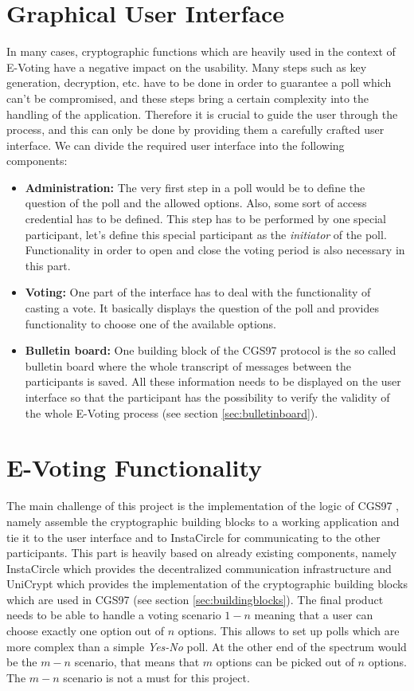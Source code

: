 \documentclass[numbers=noenddot, abstract=on, a4paper, headsepline,
footsepline, oneside, draft=off]{scrreprt}
\newcommand{\myref}[1]{(see section \vref{#1})}
\begin{document}
\section{Graphical User Interface}
\label{sec:gui}
In many cases, cryptographic functions which are heavily used in the context of
E-Voting have a negative impact on the usability. Many steps such as key
generation, decryption, etc. have to be done in order to guarantee a poll which
can't be compromised, and these steps bring a certain complexity into the
handling of the application. Therefore it is crucial to guide the user
through the process, and this can only be done by providing them a carefully
crafted user interface. We can divide the required user interface into the
following components:
\begin{itemize}
  \item \textbf{Administration:} The very first step in a poll would be to
  define the question of the poll and the allowed options. Also, some sort of
  access credential has to be defined. This step has to be performed by one
  special participant, let's define this special participant as the
  \textit{initiator} of the poll. Functionality in order to open and close the
  voting period is also necessary in this part.
  \item \textbf{Voting:} One part of the interface has to deal with the
  functionality of casting a vote. It basically displays the question of the
  poll and provides functionality to choose one of the available options.
  \item \textbf{Bulletin board:} One building block of the CGS97 protocol
  \cite{CGS97} is the so called bulletin board where the whole transcript of
  messages between the participants is saved. All these information needs to be displayed on the
  user interface so that the participant has the possibility to verify the
  validity of the whole E-Voting process \myref{sec:bulletinboard}.
\end{itemize}

\section{E-Voting Functionality}
\label{sec:evotingfunctionality}
The main challenge of this project is the implementation of the logic of CGS97 
\cite{CGS97}, namely assemble the cryptographic building blocks to a working
application and tie it to the user interface and to InstaCircle for communicating to the other
participants. This part is heavily based on already existing components, namely
InstaCircle which provides the decentralized communication infrastructure and
UniCrypt which provides the implementation of the cryptographic building blocks
which are used in CGS97 \myref{sec:buildingblocks}. The final product needs to
be able to handle a voting scenario $1-n$ meaning that a user can choose exactly
one option out of $n$ options. This allows to set up polls which are more
complex than a simple \emph{Yes-No} poll. At the other end of the spectrum would
be the $m-n$ scenario, that means that $m$ options can be picked out of $n$
options. The $m-n$ scenario is not a must for this project.
\end{document}
